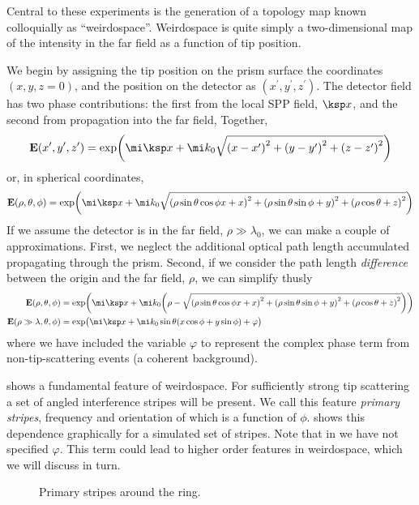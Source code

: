 Central to these experiments is the generation of a topology map known
colloquially as ``weirdospace''.  Weirdospace is quite simply a two-dimensional map of the intensity in the far field as a function of tip position.

We begin by assigning the tip position on the prism surface the coordinates
$(x,y,z=0)$, and the position on the detector as
$(x^\prime,y^\prime,z^\prime)$.  The detector field has two phase
contributions: the first from the local SPP field, $\ksp x$, and the second
from propagation into the far field, Together,
\begin{equation}
\mathbf{E}(x^\prime,y^\prime,z^\prime) = \exp\!{\left( \mi\ksp x + \mi k_0\sqrt{{(x-x^\prime)}^2+{(y-y^\prime)}^2+ {(z-z^\prime)}^2 } \right)}
\end{equation}
or, in spherical coordinates,
\begin{equation}
\mathbf{E}(\rho,\theta,\phi) = \exp\!{\left( \mi\ksp x + %
\mi k_0\sqrt{{(\rho\sin\theta\cos\phi x+x)}^2+{(\rho\sin\theta\sin\phi+y)}^2+{(\rho\cos\theta+z)}^2 } \right)}
\label{eqn:dingusthusly}
\end{equation}
If we assume the detector is in the far field, $\rho\gg\lambda_0$, we can
make a couple of approximations.  First, we neglect the additional optical
path length accumulated propagating through the prism.  Second, if we
consider the path length \textit{difference} between the origin and the far field,
$\rho$, we can simplify  thusly
\begin{align}
				\mathbf{E}(\rho,\theta,\phi) &= \exp\!{\left( \mi\ksp x + %
				\mi k_0{\left(\rho-\sqrt{{(\rho\sin\theta\cos\phi x+x)}^2+{(\rho\sin\theta\sin\phi+y)}^2+{(\rho\cos\theta+z)}^2
				}\right)} \right)}\\
				\mathbf{E}(\rho\gg\lambda,\theta,\phi) &= \exp\!{\big( \mi \ksp x
				+ \mi k_0 \sin\theta {\left(x\cos\phi+y\sin\phi\right)}
				+ \varphi\big)}
	\label{eqn:primarystripes}
\end{align}
where we have included the variable $\varphi$ to represent the complex phase term
from non-tip-scattering events (a coherent background).

 shows a fundamental feature of weirdospace.
For sufficiently strong tip scattering a set of angled interference stripes
will be present.  We call this feature \textit{primary stripes},
frequency and orientation of which is a function of $\phi$.
 shows this
dependence graphically for a simulated set of stripes.  Note that in
 we have not specified $\varphi$.  This term
could lead to higher order features in weirdospace, which we will discuss
in turn.
\begin{figure}
\centering
\caption{Primary stripes around the ring.}
\label{fig:primarystripes}
\end{figure}
